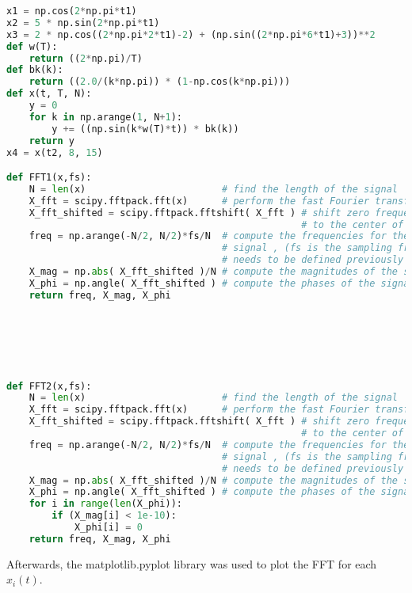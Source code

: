 \documentclass[12pt]{report}
\begin{document}
\begin{lstlisting}[language=Python]
x1 = np.cos(2*np.pi*t1)
x2 = 5 * np.sin(2*np.pi*t1)
x3 = 2 * np.cos((2*np.pi*2*t1)-2) + (np.sin((2*np.pi*6*t1)+3))**2
def w(T):
    return ((2*np.pi)/T)
def bk(k):
    return ((2.0/(k*np.pi)) * (1-np.cos(k*np.pi)))
def x(t, T, N):
    y = 0
    for k in np.arange(1, N+1):
        y += ((np.sin(k*w(T)*t)) * bk(k))
    return y
x4 = x(t2, 8, 15)

def FFT1(x,fs):
    N = len(x)                        # find the length of the signal
    X_fft = scipy.fftpack.fft(x)      # perform the fast Fourier transform (fft)
    X_fft_shifted = scipy.fftpack.fftshift( X_fft ) # shift zero frequency components
                                                    # to the center of the spectrum             
    freq = np.arange(-N/2, N/2)*fs/N  # compute the frequencies for the output
                                      # signal , (fs is the sampling frequency and
                                      # needs to be defined previously in your code
    X_mag = np.abs( X_fft_shifted )/N # compute the magnitudes of the signal
    X_phi = np.angle( X_fft_shifted ) # compute the phases of the signal 
    return freq, X_mag, X_phi






def FFT2(x,fs):
    N = len(x)                        # find the length of the signal
    X_fft = scipy.fftpack.fft(x)      # perform the fast Fourier transform (fft)
    X_fft_shifted = scipy.fftpack.fftshift( X_fft ) # shift zero frequency components
                                                    # to the center of the spectrum             
    freq = np.arange(-N/2, N/2)*fs/N  # compute the frequencies for the output
                                      # signal , (fs is the sampling frequency and
                                      # needs to be defined previously in your code
    X_mag = np.abs( X_fft_shifted )/N # compute the magnitudes of the signal
    X_phi = np.angle( X_fft_shifted ) # compute the phases of the signal    
    for i in range(len(X_phi)):
        if (X_mag[i] < 1e-10):
            X_phi[i] = 0    
    return freq, X_mag, X_phi
\end{lstlisting}
Afterwards, the matplotlib.pyplot library was used to plot the FFT for each $x_i (t)$. \pagebreak
\end{document}
